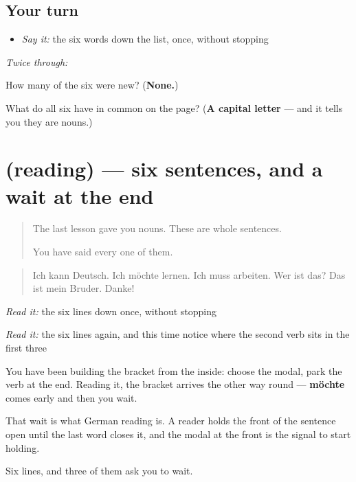 \subsection*{Your turn}
\begin{itemize}
\raggedright
  \item \emph{Say it:} the six words down the list, once, without stopping
\end{itemize}

\emph{Twice through:}

\begin{tcolorbox}[breakable,colback=teal!4,colframe=teal!35!black,title={Before you move on}]
How many of the six were new? (\textbf{None.})

What do all six have in common on the page? (\textbf{A capital letter} — and it tells you they are nouns.)
\end{tcolorbox}
\section[(reading)]{(reading) — six sentences, and a wait at the end}

\label{lesson:GE-C52-saetze}



\begin{quote}
The last lesson gave you nouns. These are whole sentences.

You have said every one of them.
\end{quote}

\begin{tcolorbox}[breakable,skin=enhanced,colback=orange!6,colframe=orange!45!black,boxrule=0.5pt,arc=1mm,left=6pt,right=6pt,top=4pt,bottom=4pt,fonttitle=\bfseries,title={Read this}]
\begin{quote}
Ich kann Deutsch. Ich möchte lernen. Ich muss arbeiten. Wer ist das? Das ist mein Bruder. Danke!
\end{quote}

\emph{Read it:} the six lines down once, without stopping

\emph{Read it:} the six lines again, and this time notice where the second verb sits in the first three
\end{tcolorbox}

\begin{grammarlens}[title={Grammar Lens: the bracket, from the outside}]
You have been building the bracket from the inside: choose the modal, park the verb at the end. Reading it, the bracket arrives the other way round — \textbf{möchte} comes early and then you wait.

That wait is what German reading is. A reader holds the front of the sentence open until the last word closes it, and the modal at the front is the signal to start holding.

Six lines, and three of them ask you to wait.
\end{grammarlens}

